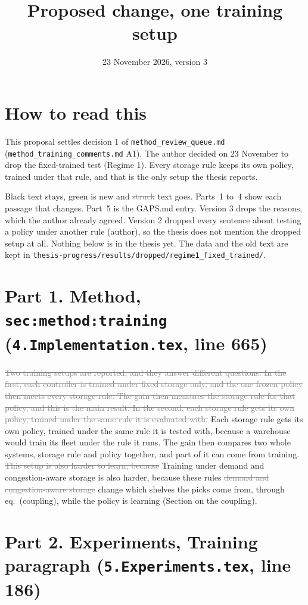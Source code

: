 \documentclass[11pt,a4paper]{article}
\title{Proposed change, one training setup}
\date{23 November 2026, version 3}
\newcommand{\new}[1]{\textcolor{newc}{#1}}
\newcommand{\old}[1]{\textcolor{gray}{\sout{#1}}}
\begin{document}
\sloppy
\maketitle

\section*{How to read this}
This proposal settles decision 1 of \texttt{method\_review\_queue.md}
(\texttt{method\_training\_comments.md} A1). The author decided on
23 November to drop the fixed-trained test (Regime 1). Every storage rule
keeps its own policy, trained under that rule, and that is the only setup
the thesis reports.

Black text stays, \new{green} is new and \old{struck} text goes. Parts~1 to~4 show each
passage that changes. Part~5 is the GAPS.md entry. Version 3 drops the reasons, which the author already agreed. Version 2 dropped every sentence about testing a policy
under another rule (author), so the thesis does not mention the dropped
setup at all. Nothing below is in the thesis
yet. The data and the old text are kept in
\texttt{thesis-progress/results/dropped/regime1\_fixed\_trained/}.

\section*{Part 1. Method, \texttt{sec:method:training} (\texttt{4.Implementation.tex}, line 665)}

\old{Two training setups are reported, and they answer different questions.
In the first, each controller is trained under fixed storage only, and the
one frozen policy then meets every storage rule. The gain then measures the
storage rule for that policy, and this is the main result. In the second,
each storage rule gets its own policy, trained under the same rule it is
evaluated with.}
\new{Each storage rule gets its own policy, trained under the same rule it
is tested with, because a warehouse would train its fleet under the rule it
runs.}
The gain then compares two whole systems, storage rule and policy together,
and part of it can come from training.
\old{This setup is also harder to learn, because}
\new{Training under demand and congestion-aware storage is also harder,
because these rules}
\old{demand and congestion-aware storage}
change which shelves the picks come from, through eq.~(coupling), while the
policy is learning (Section on the coupling).

\section*{Part 2. Experiments, Training paragraph (\texttt{5.Experiments.tex}, line 186)}
\end{document}
